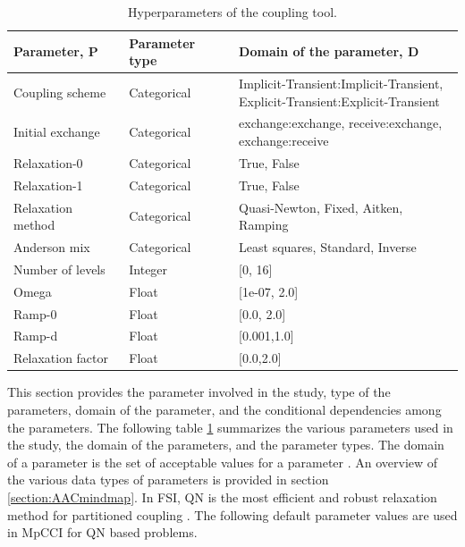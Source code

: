 \begin{table}[htbp]
\footnotesize
\begin{center}
\begin{tabular}{|l|l|l|}
\hline
\textbf{Parameter, P} & \textbf{Parameter type} & \textbf{Domain of the parameter, D} \\ \hline
Coupling scheme & Categorical &\makecell[l]{Implicit-Transient:Implicit-Transient,\\Explicit-Transient:Explicit-Transient} \\ \hline
Initial exchange & Categorical & \makecell[l]{exchange:exchange, receive:exchange, \\exchange:receive}  \\ \hline
Relaxation-0 & Categorical & True, False \\ \hline
Relaxation-1 & Categorical & True, False \\ \hline
Relaxation method & Categorical & Quasi-Newton, Fixed, Aitken, Ramping \\ \hline
Anderson mix& Categorical & Least squares, Standard, Inverse \\ \hline
Number of levels  & Integer & [0, 16] \\ \hline
Omega & Float & [1e-07, 2.0] \\ \hline
Ramp-0 & Float & [0.0, 2.0] \\ \hline
Ramp-d & Float & [0.001,1.0] \\ \hline
Relaxation factor & Float & [0.0,2.0] \\ \hline
\end{tabular}
\end{center}
\captionsetup{justification=justified}
\caption[Hyperparameters of the coupling tool]{Hyperparameters of the coupling tool.}
\label{table:parametertypes}
\end{table}

This section provides the parameter involved in the study, type of the parameters, domain of the parameter, and the conditional dependencies among the parameters. The following table \ref{table:parametertypes} summarizes the various parameters used in the study, the domain of the parameters, and the parameter types.  The domain of a parameter is the set of acceptable values for a parameter \cite{Hutterphd}. An overview of the various data types of parameters is provided in section \ref{section:AACmindmap}. In FSI, QN is the most efficient and robust relaxation method for partitioned coupling \cite{robustqn} \cite{robustqn2}. The following default parameter values are used in MpCCI for QN based problems.


